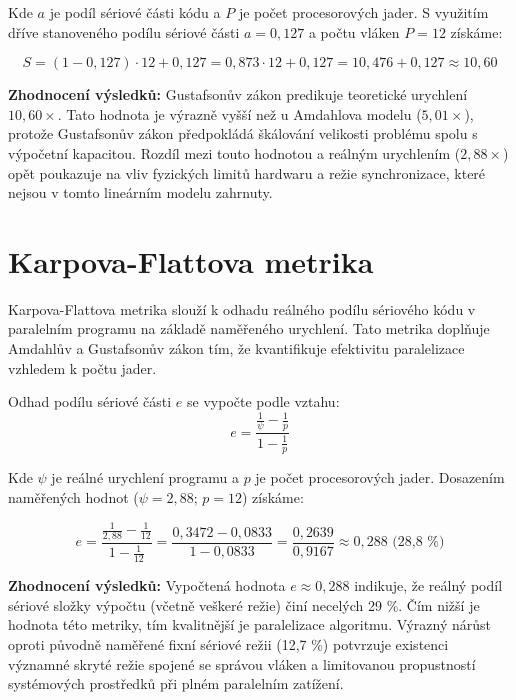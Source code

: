 \documentclass[10pt, a4paper]{report}
\begin{document}
	Kde $a$ je podíl sériové části kódu a $P$ je počet procesorových jader. S využitím dříve stanoveného podílu sériové části $a = 0,127$ a počtu vláken $P = 12$ získáme:
	
	\begin{equation}
		S = (1 - 0,127) \cdot 12 + 0,127 = 0,873 \cdot 12 + 0,127 = 10,476 + 0,127 \approx 10,60
	\end{equation}
	
	\textbf{Zhodnocení výsledků:} Gustafsonův zákon predikuje teoretické urychlení $10,60\times$. Tato hodnota je výrazně vyšší než u Amdahlova modelu ($5,01\times$), protože Gustafsonův zákon předpokládá škálování velikosti problému spolu s výpočetní kapacitou. Rozdíl mezi touto hodnotou a reálným urychlením ($2,88\times$) opět poukazuje na vliv fyzických limitů hardwaru a režie synchronizace, které nejsou v tomto lineárním modelu zahrnuty.
	
	\section{Karpova-Flattova metrika}
	
	Karpova-Flattova metrika slouží k odhadu reálného podílu sériového kódu v paralelním programu na základě naměřeného urychlení. Tato metrika doplňuje Amdahlův a Gustafsonův zákon tím, že kvantifikuje efektivitu paralelizace vzhledem k počtu jader.
	
	Odhad podílu sériové části $e$ se vypočte podle vztahu:
	\begin{equation}
		e = \frac{\frac{1}{\psi} - \frac{1}{p}}{1 - \frac{1}{p}}
	\end{equation}
	
	Kde $\psi$ je reálné urychlení programu a $p$ je počet procesorových jader. Dosazením naměřených hodnot ($\psi = 2,88$; $p = 12$) získáme:
	
	\begin{equation}
		e = \frac{\frac{1}{2,88} - \frac{1}{12}}{1 - \frac{1}{12}} = \frac{0,3472 - 0,0833}{1 - 0,0833} = \frac{0,2639}{0,9167} \approx 0,288 \text{ (28,8 \%)}
	\end{equation}
	
	\textbf{Zhodnocení výsledků:} Vypočtená hodnota $e \approx 0,288$ indikuje, že reálný podíl sériové složky výpočtu (včetně veškeré režie) činí necelých 29 \%. Čím nižší je hodnota této metriky, tím kvalitnější je paralelizace algoritmu. Výrazný nárůst oproti původně naměřené fixní sériové režii (12,7 \%) potvrzuje existenci významné skryté režie spojené se správou vláken a limitovanou propustností systémových prostředků při plném paralelním zatížení.
	
\end{document}

